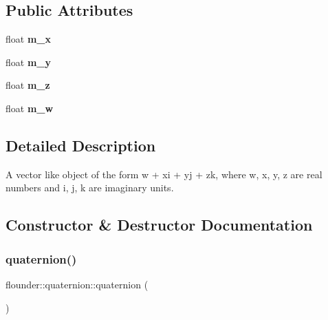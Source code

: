 \subsection*{Public Attributes}
\begin{DoxyCompactItemize}
\item 
\mbox{\label{classflounder_1_1quaternion_a8b6b137868cee6e3aa53e58142845772}} 
float {\bfseries m\+\_\+x}
\item 
\mbox{\label{classflounder_1_1quaternion_a53179da28d62f0a9d75b09d2f24eb42a}} 
float {\bfseries m\+\_\+y}
\item 
\mbox{\label{classflounder_1_1quaternion_a2d8298945f2ddc70b4fbb5b15b01d372}} 
float {\bfseries m\+\_\+z}
\item 
\mbox{\label{classflounder_1_1quaternion_a7e2a47a8f02b1c5085110178a4727306}} 
float {\bfseries m\+\_\+w}
\end{DoxyCompactItemize}


\subsection{Detailed Description}
A vector like object of the form w + xi + yj + zk, where w, x, y, z are real numbers and i, j, k are imaginary units. 



\subsection{Constructor \& Destructor Documentation}
\mbox{\label{classflounder_1_1quaternion_ae3b0e48772c0394a9a87aedc9b89e5b6}} 
\subsubsection{\texorpdfstring{quaternion()}{quaternion()}\hspace{0.1cm}{\footnotesize\ttfamily [1/4]}}
{\footnotesize\ttfamily flounder\+::quaternion\+::quaternion (\begin{DoxyParamCaption}{ }\end{DoxyParamCaption})}



